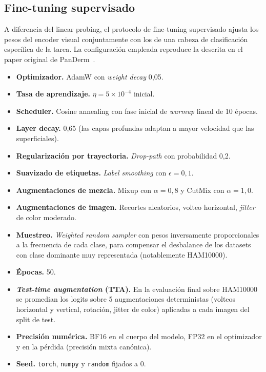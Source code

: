 \subsection{Fine-tuning supervisado}
\label{sec:ft-protocol}

A diferencia del linear probing, el protocolo de fine-tuning
supervisado ajusta los pesos del encoder visual conjuntamente con
los de una cabeza de clasificación específica de la tarea. La
configuración empleada reproduce la descrita en el paper original
de PanDerm~\cite{panderm2025}.

\begin{itemize}
\item \textbf{Optimizador.} AdamW con \emph{weight decay} 0{,}05.
\item \textbf{Tasa de aprendizaje.} $\eta=5\times10^{-4}$ inicial.
\item \textbf{Scheduler.} Cosine annealing con fase inicial de
\emph{warmup} lineal de 10 épocas.
\item \textbf{Layer decay.} 0{,}65 (las capas profundas adaptan a
mayor velocidad que las superficiales).
\item \textbf{Regularización por trayectoria.} \emph{Drop-path}
con probabilidad 0{,}2.
\item \textbf{Suavizado de etiquetas.} \emph{Label smoothing} con
$\epsilon=0{,}1$.
\item \textbf{Augmentaciones de mezcla.} Mixup con $\alpha=0{,}8$
y CutMix con $\alpha=1{,}0$.
\item \textbf{Augmentaciones de imagen.} Recortes aleatorios,
volteo horizontal, \emph{jitter} de color moderado.
\item \textbf{Muestreo.} \emph{Weighted random sampler} con pesos
inversamente proporcionales a la frecuencia de cada clase, para
compensar el desbalance de los datasets con clase dominante muy
representada (notablemente HAM10000).
\item \textbf{Épocas.} 50.
\item \textbf{\emph{Test-time augmentation} (TTA).} En la
evaluación final sobre HAM10000 se promedian los logits sobre 5
augmentaciones deterministas (volteos horizontal y vertical,
rotación, jitter de color) aplicadas a cada imagen del split de
test.
\item \textbf{Precisión numérica.} BF16 en el cuerpo del modelo,
FP32 en el optimizador y en la pérdida (precisión mixta canónica).
\item \textbf{Seed.} \texttt{torch}, \texttt{numpy} y
\texttt{random} fijados a 0.
\end{itemize}

